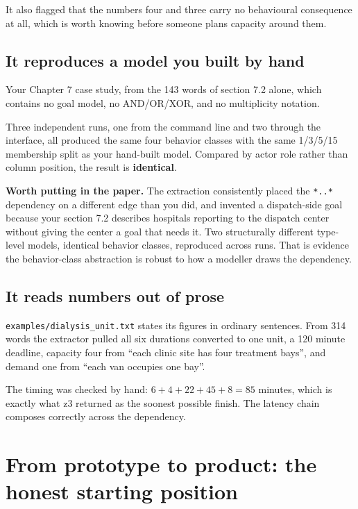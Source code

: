 \documentclass[11pt,a4paper]{article}
\begin{document}
It also flagged that the numbers four and three carry no behavioural consequence at all,
which is worth knowing before someone plans capacity around them.

\subsection{It reproduces a model you built by hand}

Your Chapter 7 case study, from the 143 words of section 7.2 alone, which contains no
goal model, no AND/OR/XOR, and no multiplicity notation.

Three independent runs, one from the command line and two through the interface, all
produced the same four behavior classes with the same 1/3/5/15 membership split as your
hand-built model. Compared by actor role rather than column position, the result is
\textbf{identical}.

\begin{keybox}
\textbf{Worth putting in the paper.} The extraction consistently placed the
\texttt{*..*} dependency on a different edge than you did, and invented a dispatch-side
goal because your section 7.2 describes hospitals reporting to the dispatch center
without giving the center a goal that needs it. Two structurally different type-level
models, identical behavior classes, reproduced across runs. That is evidence the
behavior-class abstraction is robust to how a modeller draws the dependency.
\end{keybox}

\subsection{It reads numbers out of prose}

\texttt{examples/dialysis\_unit.txt} states its figures in ordinary sentences. From 314
words the extractor pulled all six durations converted to one unit, a 120 minute
deadline, capacity four from ``each clinic site has four treatment bays'', and demand one
from ``each van occupies one bay''.

The timing was checked by hand: $6 + 4 + 22 + 45 + 8 = 85$ minutes, which is exactly what
z3 returned as the soonest possible finish. The latency chain composes correctly across
the dependency.

\newpage
\section{From prototype to product: the honest starting position}
\end{document}
